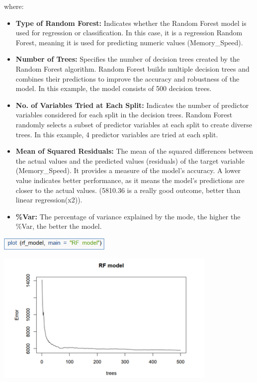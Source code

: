 \tab where:
\begin{itemize}
    \item \textbf{Type of Random Forest:} Indicates whether the Random Forest model is used for regression or classification. In this case, it is a regression Random Forest, meaning it is used for predicting numeric values (Memory\_Speed). 
    \item \textbf{Number of Trees:} Specifies the number of decision trees created by the Random Forest algorithm. Random Forest builds multiple decision trees and combines their predictions to improve the accuracy and robustness of the model. In this example, the model consists of 500 decision trees.
    \item \textbf{No. of Variables Tried at Each Split:} Indicates the number of predictor variables considered for each split in the decision trees. Random Forest randomly selects a subset of predictor variables at each split to create diverse trees. In this example, 4 predictor variables are tried at each split.
    \item \textbf{Mean of Squared Residuals:} The mean of the squared differences between the actual values and the predicted values (residuals) of the target variable (Memory\_Speed). It provides a measure of the model's accuracy. A lower value indicates better performance, as it means the model's predictions are closer to the actual values. (5810.36 is a really good outcome, better than linear regression(x2)). 
    \item \textbf{\%Var:} The percentage of variance explained by the mode, the higher the \%Var, the better the model.
    
\end{itemize}

\begin{center}
    \includegraphics[width=0.4\textwidth]{build-forest3.png}
\end{center}

\begin{center}
    \includegraphics[width=0.8\textwidth]{build-forest4.png}
\end{center}

